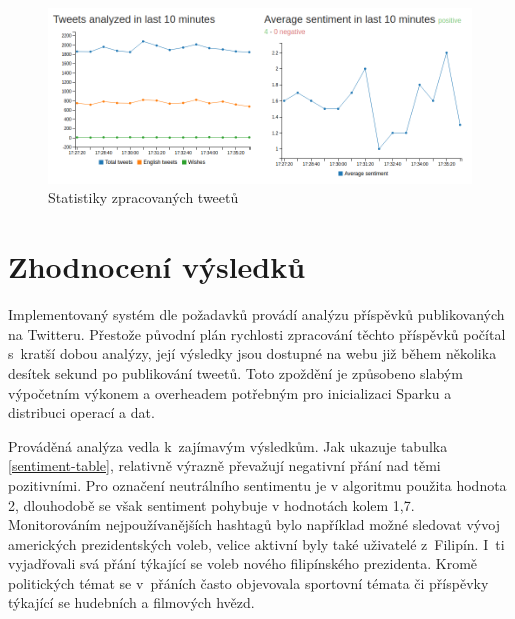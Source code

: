 \documentclass[thesis=B,czech]{FITthesis}[2012/06/26]
\begin{document}
	\begin{figure}[ht]
    	\centering
    	\includegraphics[width=1\textwidth]{images/web-stats.png}
    	\caption{Statistiky zpracovaných tweetů}
    	\label{fig:web-stats}
	\end{figure}

\chapter{Zhodnocení výsledků}
\label{zhodnoceni}
Implementovaný systém dle požadavků provádí analýzu příspěvků publikovaných na Twitteru. Přestože původní plán rychlosti zpracování těchto příspěvků počítal s~kratší dobou analýzy, její výsledky jsou dostupné na webu již během několika desítek sekund po publikování tweetů. Toto zpoždění je způsobeno slabým výpočetním výkonem a overheadem potřebným pro inicializaci Sparku a distribuci operací a dat. 

Prováděná analýza vedla k~zajímavým výsledkům. Jak ukazuje tabulka \ref{sentiment-table}, relativně výrazně převažují negativní přání nad těmi pozitivními. Pro označení neutrálního sentimentu je v algoritmu použita hodnota 2, dlouhodobě se však sentiment pohybuje v hodnotách kolem 1,7. Monitorováním nejpoužívanějších hashtagů bylo například možné sledovat vývoj amerických prezidentských voleb, velice aktivní byly také uživatelé z~Filipín. I~ti vyjadřovali svá přání týkající se voleb nového filipínského prezidenta. Kromě politických témat se v~přáních často objevovala sportovní témata či příspěvky týkající se hudebních a filmových hvězd. 
\end{document}
